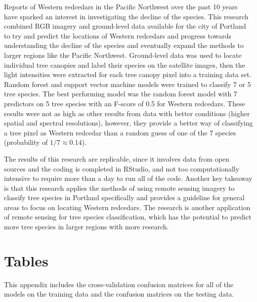 \documentclass[12pt,twoside]{reedthesis}
\begin{document}
Reports of Western redcedars in the Pacific Northwest over the past 10 years have sparked an interest in investigating the decline of the species. This research combined RGB imagery and ground-level data available for the city of Portland to try and predict the locations of Western redcedars and progress towards understanding the decline of the species and eventually expand the methods to larger regions like the Pacific Northwest. Ground-level data was used to locate individual tree canopies and label their species on the satellite images, then the light intensities were extracted for each tree canopy pixel into a training data set. Random forest and support vector machine models were trained to classify 7 or 5 tree species. The best performing model was the random forest model with 7 predictors on 5 tree species with an F-score of 0.5 for Western redcedars. These results were not as high as other results from data with better conditions (higher spatial and spectral resolutions), however, they provide a better way of classifying a tree pixel as Western redcedar than a random guess of one of the 7 species (probability of \(1/7 \approx 0.14\)).

The results of this research are replicable, since it involves data from open sources and the coding is completed in RStudio, and not too computationally intensive to require more than a day to run all of the code. Another key takeaway is that this research applies the methods of using remote sensing imagery to classify tree species in Portland specifically and provides a guideline for general areas to focus on locating Western redcedars. The research is another application of remote sensing for tree species classification, which has the potential to predict more tree species in larger regions with more research.

\appendix

\hypertarget{tables}{%
\chapter{Tables}\label{tables}}

This appendix includes the cross-validation confusion matrices for all of the models on the training data and the confusion matrices on the testing data.
\end{document}
